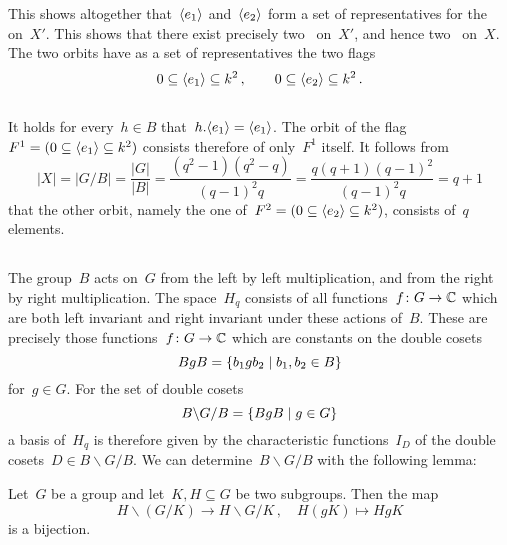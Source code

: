 This shows altogether that~$\langle e_1\rangle$ and~$\langle e_2\rangle$ form a set of representatives for the~ on~$X'$.
This shows that there exist precisely two~ on~$X'$, and hence two~ on~$X$.
The two orbits have as a set of representatives the two flags
\begin{equation}
  \label{flag representatives}
            0
  \subseteq \langle e_1\rangle
  \subseteq k^2 \,,
  \qquad
            0
  \subseteq \langle e_2\rangle
  \subseteq k^2 \,.
\end{equation}





\subsection{}

It holds for every~$h \in B$ that~$h.\langle e_1\rangle = \langle e_1\rangle$.
The orbit of the flag~$F^1 = (0 \subseteq \langle e_1\rangle \subseteq k^2)$ consists therefore of only~$F^1$ itself.
It follows from
\[
    |X|
  = |G/B|
  = \frac{|G|}{|B|}
  = \frac{(q^2 - 1)(q^2 - q)}{(q-1)^2 q}
  = \frac{q(q+1)(q-1)^2}{(q-1)^2 q}
  = q+1
\]
that the other orbit, namely the one of~$F^2 = (0 \subseteq \langle e_2\rangle \subseteq k^2)$, consists of~$q$ elements.





\subsection{}

The group~$B$ acts on~$G$ from the left by left multiplication, and from the right by right multiplication.
The space~$H_q$ consists of all functions~$f \colon G \to \mathbb{C}$ which are both left invariant and right invariant under these actions of~$B$.
These are precisely those functions~$f \colon G \to \mathbb{C}$ which are constants on the double cosets
\[
    BgB
  = \{
      b_1 g b_2
    \suchthat
      b_1, b_2 \in B
    \}
\]
for~$g \in G$.
For the set of double cosets
\[
    B \backslash G / B
  = \{
      B g B
    \suchthat
      g \in G
    \}
\]
a basis of~$H_q$ is therefore given by the characteristic functions~$I_D$ of the double cosets~$D \in B \backslash G / B$.
We can determine~$B \backslash G / B$ with the following lemma:

\begin{lemma}
  \label{double cosets}
  Let~$G$ be a group and let~$K, H \subseteq G$ be two subgroups.
  Then the map
  \[
            H \backslash (G / K)
    \to     H \backslash G / K \,,
    \quad   H(gK)
    \mapsto HgK
  \]
  is a {\welldef} bijection.
\end{lemma}

